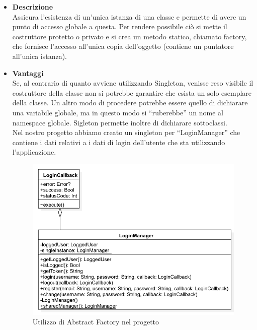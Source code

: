 		\begin{itemize}
			\item \textbf{Descrizione}\\ 
			 Assicura l'esistenza di un'unica istanza di una classe e permette di avere un punto di accesso globale a questa.
			 Per rendere possibile ciò si mette il costruttore protetto o privato e si crea un metodo statico, chiamato factory, che fornisce l’accesso all'unica copia dell’oggetto (contiene un puntatore all’unica istanza).			 
			 \item \textbf{Vantaggi}\\ 
			 Se, al contrario di quanto avviene utilizzando Singleton, venisse reso visibile il costruttore della classe non si potrebbe garantire che esista un solo esemplare della classe. Un altro modo di procedere potrebbe essere quello di dichiarare una variabile globale, ma in questo modo si ``ruberebbe'' un nome al namespace globale.
			 Sigleton permette inoltre di dichiarare sottoclassi.			 
			 \utilizzo \\ 
			 Nel nostro progetto abbiamo creato un singleton per ``LoginManager'' che contiene i dati relativi a i dati di login dell'utente che sta utilizzando l'applicazione.
			 
			 	\begin{figure}[!h]
			 		\centering
			 		\includegraphics[scale=0.4]{img/package/png/client--loginmanager}  
			 		\caption{Utilizzo di Abstract Factory nel progetto}
			 	\end{figure}
			 
		\end{itemize}
		
		
		
